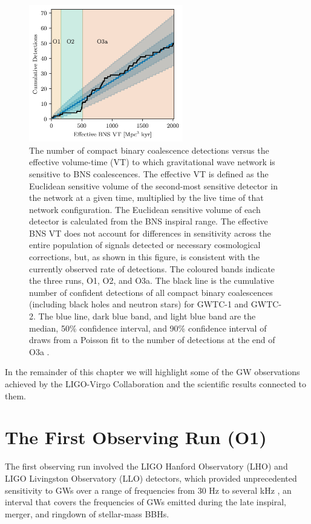 \documentclass[binding=0.6cm, LaM]{sapthesis}
\begin{document}
        \begin{figure}[!t]
          \label{o3detection}
          \includegraphics[width=0.6\textwidth]{o3detection}
          \centering
          \caption{The number of compact binary coalescence detections versus the effective volume-time (VT) to which gravitational wave network is sensitive to BNS coalescences. The effective VT is defined as the Euclidean sensitive volume of the second-most sensitive detector in the network at a given time, multiplied by the live time of that network configuration. The Euclidean sensitive volume of each detector is calculated from the BNS inspiral range. The effective BNS VT does not account for differences in sensitivity across the entire population of signals detected or necessary cosmological corrections, but, as shown in this figure, is consistent with the currently observed rate of detections. The coloured bands indicate the three runs, O1, O2, and O3a. The black line is the cumulative number of confident detections of all compact binary coalescences (including black holes and neutron stars) for GWTC-1 and GWTC-2. The blue line, dark blue band, and light blue band are the median, 50\% confidence interval, and 90\% confidence interval of draws from a Poisson fit to the number of detections at the end of O3a \cite{49}.}
          \label{fig:o3detection}
        \end{figure}

        In the remainder of this chapter we will highlight some of the GW observations achieved 
	by the LIGO-Virgo Collaboration and the scientific results connected to them.

\section{The First Observing Run (O1)}
	The first observing run involved the LIGO Hanford Observatory (LHO) and LIGO Livingston Observatory (LLO) detectors, 
	which provided unprecedented sensitivity to GWs
	over a range of frequencies from 30 Hz to several kHz \cite{14}, an interval that  
	covers the frequencies of GWs emitted during 
	the late inspiral, merger, and ringdown of stellar-mass BBHs.
\end{document}
